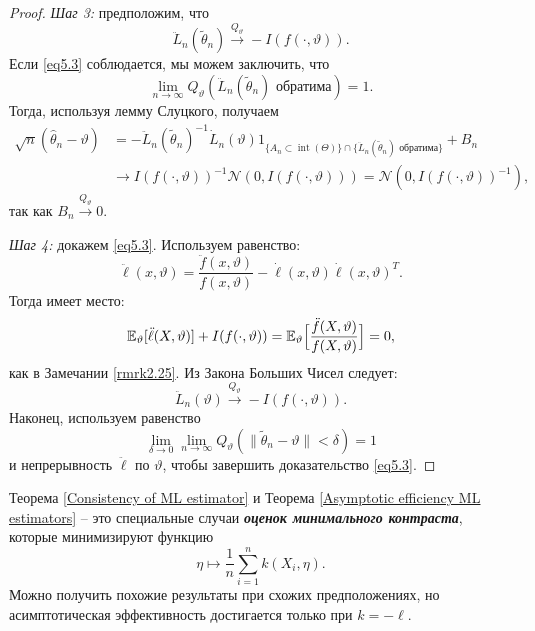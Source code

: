 \begin{proof}
	\textit{Шаг 3:} предположим, что
	\begin{equation} \label{eq5.3}
		\ddot{L}_n(\widetilde{\theta}_n) \xrightarrow{Q_\vartheta} -I(f(\cdot, \vartheta)).
	\end{equation}
	Если \eqref{eq5.3} соблюдается, мы можем заключить, что
	\[ \lim\limits_{n \rightarrow \infty} Q_\vartheta(\ddot{L}_n(\widetilde{\theta}_n) \text{ обратима}) = 1. \]
	Тогда, используя лемму Слуцкого, получаем
	\[
	\begin{aligned}
	\sqrt{n}(\hat{\theta}_n - \vartheta) & = -\ddot{L}_n(\widetilde{\theta}_n)^{-1} \dot{L}_n(\vartheta) 1_{ \{ A_n \subset \operatorname{int}(\Theta)
	 \} \cap \{ \ddot{L}_n(\widetilde{\theta}_n) \text{ обратима} \}} + B_n \\
	& \rightarrow I(f(\cdot, \vartheta))^{-1} \mathcal{N}(0, I(f(\cdot, \vartheta))) = \mathcal{N}(0, I(f(\cdot, \vartheta))^{-1}),
	\end{aligned}
	\]
	так как $B_n \xrightarrow{Q_\vartheta} 0$.
	
	\textit{Шаг 4:} докажем \eqref{eq5.3}. Используем равенство:
	\[ \ddot{\ell}(x, \vartheta) = \frac{\ddot{f}(x, \vartheta)}{f(x,\vartheta)} - \dot{\ell}(x, \vartheta)\dot{\ell}(x, \vartheta)^T. \]
	Тогда имеет место:
	\[\mathbb{E}_\vartheta[\ddot{\ell}(X, \vartheta)] + I(f(\cdot, \vartheta)) = \mathbb{E}_\vartheta\Big[ \frac{\ddot{f}(X, \vartheta)}{f(X,\vartheta)} \Big] = 0, \]
	как в Замечании \ref{rmrk2.25}. Из Закона Больших Чисел следует:
	\[ \ddot{L}_n(\vartheta) \xrightarrow{Q_\vartheta} - I(f(\cdot, \vartheta)). \]
	Наконец, используем равенство
	\[ \lim\limits_{\delta \rightarrow 0} \lim\limits_{n \rightarrow \infty} Q_\vartheta(\| \widetilde{\theta}_n - \vartheta \| < \delta) = 1 \]
	и непрерывность $\ddot{\ell}$ по $\vartheta$, чтобы завершить доказательство \eqref{eq5.3}.
\end{proof}

\begin{rmrk}
	Теорема \ref{Consistency of ML estimator} и Теорема \ref{Asymptotic efficiency ML estimators} -- это специальные случаи \textbf{\textit{оценок минимального контраста}}, которые минимизируют функцию
	\[ \eta \mapsto \frac{1}{n} \sum_{i=1}^{n}k(X_i, \eta). \]
	Можно получить похожие результаты при схожих предположениях, но асимптотическая эффективность достигается только при $k = -\ell$.
\end{rmrk}

